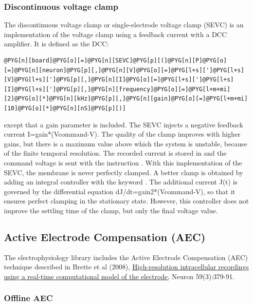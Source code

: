 \documentclass[letterpaper,10pt,english]{manual}
\begin{document}
\subsubsection{Discontinuous voltage clamp}

The discontinuous voltage clamp or single-electrode voltage clamp (SEVC) is
an implementation of the voltage clamp using a feedback current with a DCC
amplifier. It is defined as the DCC:

\begin{Verbatim}[commandchars=@\[\]]
@PYG[n][board]@PYG[o][=]@PYG[n][SEVC]@PYG[p][(]@PYG[n][P]@PYG[o][=]@PYG[n][neuron]@PYG[p][,]@PYG[n][V]@PYG[o][=]@PYG[l+s][']@PYG[l+s][V]@PYG[l+s][']@PYG[p][,]@PYG[n][I]@PYG[o][=]@PYG[l+s][']@PYG[l+s][I]@PYG[l+s][']@PYG[p][,]@PYG[n][frequency]@PYG[o][=]@PYG[l+m+mi][2]@PYG[o][*]@PYG[n][kHz]@PYG[p][,]@PYG[n][gain]@PYG[o][=]@PYG[l+m+mi][10]@PYG[o][*]@PYG[n][nS]@PYG[p][)]
\end{Verbatim}

except that a gain parameter is included. The SEVC injects a negative
feedback current I=gain*(Vcommand-V). The quality of the clamp improves with
higher gains, but there is a maximum value above which the system is unstable,
because of the finite temporal resolution.
The recorded current is stored in  and the command voltage is sent
with the instruction .
With this implementation of the SEVC, the membrane is never perfectly clamped.
A better clamp is obtained by adding an integral controller with the keyword
. The additional current J(t) is governed by the differential
equation dJ/dt=gain2*(Vcommand-V), so that it ensures perfect clamping in the
stationary state.
However, this controller does not improve the settling time of the clamp, but
only the final voltage value.


\subsection{Active Electrode Compensation (AEC)}

The electrophysiology library includes the Active Electrode Compensation (AEC) technique
described in Brette et al (2008),
\href{http://www.di.ens.fr/~brette/papers/Brette2008Neuron.html}{High-resolution intracellular recordings using a real-time computational model of the electrode},
Neuron 59(3):379-91.


\subsubsection{Offline AEC}
\end{document}
